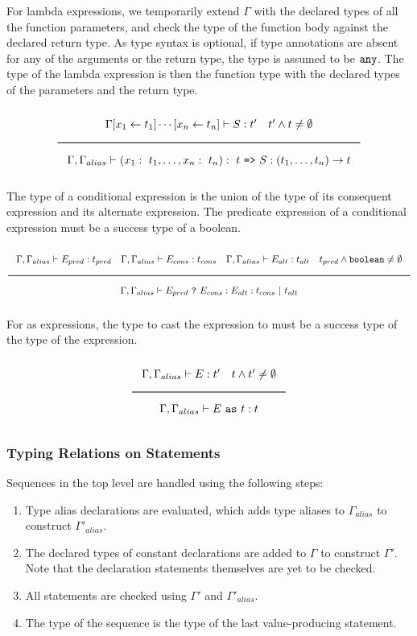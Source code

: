 For lambda expressions, we temporarily extend $\Gamma$ with the declared types of all the function parameters,
and check the type of the function body against the declared return type.
As type syntax is optional, if type annotations are absent for any of the arguments or the return type, the type is assumed to be $\texttt{any}$.
The type of the lambda expression is then the function type with the declared types of the parameters and the return type. 

\noindent
\[
  \Rule{\Gamma [x_1 \leftarrow t_1] \cdots [x_n \leftarrow t_n] \vdash S : t' \quad t' \wedge t \neq \emptyset}{
    \Gamma, \Gamma_{alias} \vdash (x_1:\ t_1, \ldots, x_n:\ t_n) :\ t\ \texttt{=>}\ S : (t_1, \ldots, t_n) \rightarrow t}  
\]
\noindent

The type of a conditional expression is the union of the type of its consequent expression and its alternate expression.
The predicate expression of a conditional expression must be a success type of a boolean.

\noindent
\[
  \Rule{\Gamma, \Gamma_{alias} \vdash E_{pred} : t_{pred} \quad \Gamma, \Gamma_{alias} \vdash E_{cons} : t_{cons} \quad \Gamma, \Gamma_{alias} \vdash E_{alt} : t_{alt}
    \quad t_{pred} \wedge \Bool \neq \emptyset}{\Gamma, \Gamma_{alias} \vdash E_{pred}\ \texttt{?}\ E_{cons} : E_{alt} : t_{cons}\ |\ t_{alt}}
\]
\noindent

For as expressions, the type to cast the expression to must be a success type of the type of the expression.

\noindent
\[
  \Rule{\Gamma, \Gamma_{alias} \vdash E : t' \quad t \wedge t' \neq \emptyset}{\Gamma, \Gamma_{alias} \vdash E\ \texttt{as}\ t : t}  
\]
\noindent

\subsubsection{Typing Relations on Statements}

Sequences in the top level are handled using the following steps:

\begin{enumerate}
\item{Type alias declarations are evaluated, which adds type aliases to $\Gamma_{alias}$ to construct $\Gamma'_{alias}$.}
\item{The declared types of constant declarations are added to $\Gamma$ to construct $\Gamma'$.
  Note that the declaration statements themselves are yet to be checked.}
\item{All statements are checked using $\Gamma'$ and $\Gamma'_{alias}$.}
\item{The type of the sequence is the type of the last value-producing statement.}
\end{enumerate}

